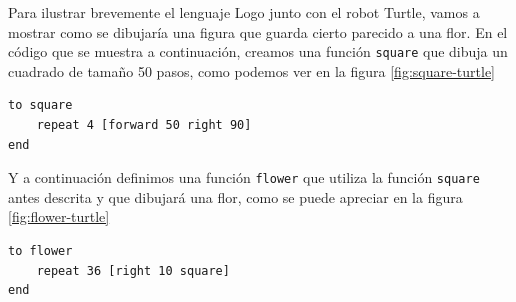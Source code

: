 Para ilustrar brevemente el lenguaje Logo junto con el robot Turtle, vamos a mostrar como se dibujaría una figura que guarda cierto parecido a una flor.
En el código que se muestra a continuación, creamos una función \texttt{square} que dibuja un cuadrado de tamaño 50 pasos, como podemos ver en la figura \ref{fig:square-turtle}

\begin{lstlisting}
to square
	repeat 4 [forward 50 right 90]
end
\end{lstlisting}

Y a continuación definimos una función \texttt{flower} que utiliza la función \texttt{square} antes descrita y que dibujará una flor, como se puede apreciar en la figura \ref{fig:flower-turtle}

\begin{lstlisting}
to flower
	repeat 36 [right 10 square]
end
\end{lstlisting}

